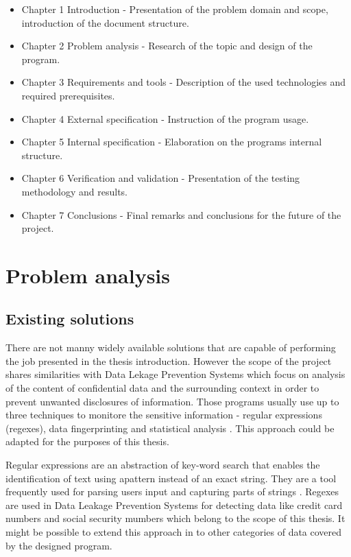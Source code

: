 \documentclass[a4paper,twoside,12pt]{book}
\begin{document}
\begin{itemize}
   \item Chapter 1 Introduction - Presentation of the problem domain and scope, introduction of the document structure.
   \item Chapter 2 Problem analysis - Research of the topic and design of the program.
   \item Chapter 3 Requirements and tools - Description of the used technologies and required prerequisites.
   \item Chapter 4 External specification - Instruction of the program usage.
   \item Chapter 5 Internal specification - Elaboration on the programs internal structure.
   \item Chapter 6 Verification and validation - Presentation of the testing methodology and results.
   \item Chapter 7 Conclusions - Final remarks and conclusions for the future of the project.
   \end{itemize}

\chapter{Problem analysis}

\section{Existing solutions}

There are not manny widely available solutions that are capable of performing the job presented in the thesis introduction. However the scope of the project shares
similarities with Data Lekage Prevention Systems which focus on analysis of the content of confidential data and the surrounding context in order to
prevent unwanted disclosures of information. Those programs usually use up to three techniques to monitore the sensitive information - regular expressions (regexes),
data fingerprinting and statistical analysis \cite{bib:articleDLPS}. This approach could be adapted for the purposes of this thesis. 

Regular expressions are an abstraction of key-word search that enables the identification of text using apattern instead of an exact string. They are a tool 
frequently used for parsing users input and capturing parts of strings \cite{bib:conferenceRegex}. Regexes are used in Data Leakage Prevention Systems for detecting 
data like credit card numbers and social security mumbers \cite{bib:articleDLPS} which belong to the scope of this thesis. It might be possible to extend this approach 
in to other categories of data covered by the designed program.
\end{document}
